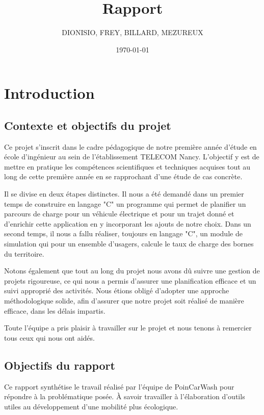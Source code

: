 \documentclass[a4paper, 12pt]{report}
\title{Rapport}
\author{DIONISIO, FREY, BILLARD, MEZUREUX}
\date{\today}
\begin{document}
\maketitle
\dominitoc
{}
\tableofcontents

\chapter{Introduction}
\minitoc
{}
\clearpage

\section{Contexte et objectifs du projet}

Ce projet s'inscrit dans le cadre pédagogique de notre première année d'étude en école d'ingénieur au sein de l'établissement TELECOM Nancy. L'objectif y est de mettre en pratique les compétences scientifiques et techniques acquises tout au long de cette première année en se rapprochant d'une étude de cas concrète.
\bigskip

Il se divise en deux étapes distinctes. Il nous a été demandé dans un premier temps de construire en langage "C" un programme qui permet de planifier un parcours de charge pour un véhicule électrique et pour un trajet donné et d'enrichir cette application en y incorporant les ajouts de notre choix. Dans un second temps, il nous a fallu réaliser, toujours en langage "C", un module de simulation qui pour un ensemble d'usagers, calcule le taux de charge des bornes du territoire.
\bigskip

Notons également que tout au long du projet nous avons dû suivre une gestion de projets rigoureuse, ce
qui nous a permis d’assurer une planification efficace et un suivi approprié des activités. Nous étions
obligé d'adopter une approche méthodologique solide, afin d’assurer que notre projet soit réalisé de manière efficace, dans les délais impartis.
\bigskip

Toute l’équipe a pris plaisir à travailler sur le projet et nous tenons à remercier tous ceux qui nous
ont aidés.

\section{Objectifs du rapport}

Ce rapport synthétise le travail réalisé par l'équipe de PoinCarWash pour répondre à la problématique posée. À savoir travailler à l'élaboration d'outils utiles au développement d'une mobilité plus écologique.
\end{document}
